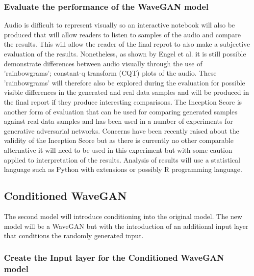 \documentclass[titlepage]{article}
\begin{document}
\subsubsection{Evaluate the performance of the WaveGAN model}

Audio is difficult to represent visually so an interactive notebook will also be produced that will allow readers to listen to samples of the audio and compare the results.
This will allow the reader of the final reprot to also make a subjective evaluation of the results.
\newline
\newline
Nonetheless, as shown by Engel et al. it is still possible demonstrate differences between audio visually through the use of 'rainbowgrams'; constant-q transform (CQT) plots of the audio.
These 'rainbowgrams' will therefore also be explored during the evaluation for possible visible differences in the generated and real data samples and will be produced in the final report if they produce interesting comparisons.
\newline
\newline
The Inception Score is another form of evaluation that can be used for comparing generated samples against real data samples and has been used in a number of experiments for generative adversarial networks.
Concerns have been recently raised about the validity of the Inception Score but as there is currently no other comparable alternative it will need to be used in this experiment but with some caution applied to interpretation of the results.
\newline
\newline
Analysis of results will use a statistical language such as Python with extensions or possibly R programming language.

\subsection{Conditioned WaveGAN}

The second model will introduce conditioning into the original model.
The new model will be a WaveGAN but with the introduction of an additional input layer that conditions the randomly generated input.

\subsubsection{Create the Input layer for the Conditioned WaveGAN model}
\end{document}
